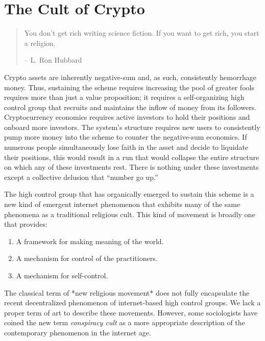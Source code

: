 \chapter{The Cult of Crypto}

\begin{quote}
You don't get rich writing science fiction. If you want to get rich, you start
a religion.
\begin{flushright}
-- L. Ron Hubbard
\end{flushright}
\end{quote}


Crypto assets are inherently negative-sum and, as such, consistently hemorrhage
money. Thus, sustaining the scheme requires increasing the pool of greater fools
requires more than just a value proposition; it requires a self-organizing high
control group that recruits and maintains the inflow of money from its
followers. Cryptocurrency economics requires active investors to hold their
positions and onboard more investors. The system's structure requires new users
to consistently pump more money into the scheme to counter the negative-sum
economics. If numerous people simultaneously lose faith in the asset and decide
to liquidate their positions, this would result in a run that would collapse the
entire structure on which any of these investments rest. There is nothing under
these investments except a collective delusion that ``number go up.''

The high control group that has organically emerged to sustain this scheme is a
new kind of emergent internet phenomenon that exhibits many of the same
phenomena as a traditional religious cult. This kind of movement is broadly one
that provides:

\begin{enumerate}
  \item A framework for making meaning of the world.
  \item A mechanism for control of the practitioners.
  \item A mechanism for self-control.
\end{enumerate}

The classical term of *new religious movement* does not fully encapsulate the
recent decentralized phenomenon of internet-based high control groups. We lack a
proper term of art to describe these movements. However, some sociologists have
coined the new term \textit{conspiracy cult} as a more appropriate description
of the contemporary phenomenon in the internet age.

